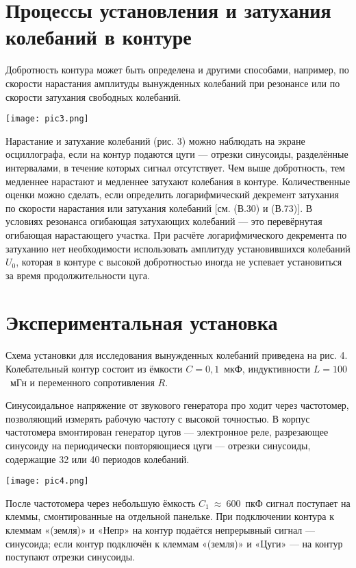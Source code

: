 \section{\label{sec:level1}Процессы
установления
и затухания
колебаний
в
контуре}

Добротность
контура может быть определена
и другими способами,
например, по скорости нарастания амплитуды вынужденных
колебаний при резонансе или по скорости затухания свободных
колебаний.

\texttt{[image: pic3.png]}

Нарастание
и затухание
колебаний
(рис. 3) можно наблюдать на экране осциллографа, если на
контур подаются
цуги — отрезки синусоиды, разделённые интервалами, в течение
которых
сигнал отсутствует. Чем выше добротность, тем медленнее нарастают
и медленнее затухают
колебания в контуре.
Количественные оценки можно сделать,
если определить логарифмический декремент затухания по скорости нарастания или затухания
колебаний [см. (В.30) и (В.73)].
В
условиях резонанса
огибающая затухающих
колебаний
— это перевёрнутая огибающая нарастающего участка. При расчёте логарифмического декремента по затуханию нет необходимости использовать амплитуду
установившихся
колебаний
$U_0$, которая в контуре с высокой добротностью иногда не успевает
установиться за время продолжительности цуга.

\section{\label{sec:level1}Экспериментальная установка}

Схема
установки для исследования
вынужденных
колебаний приведена на рис. 4. Колебательный
контур состоит из ёмкости $C = 0,1$~мкФ, индуктивности $L = 100$~мГн
и переменного
сопротивления
$R$.

Синусоидальное напряжение от звукового генератора про
ходит через
частотомер, позволяющий измерять рабочую частоту с высокой точностью.
В
корпус частотомера вмонтирован генератор цугов
— электронное
реле, разрезающее синусоиду на периодически повторяющиеся цуги
— отрезки синусоиды, содержащие 32 или 40 периодов
колебаний.

\texttt{[image: pic4.png]}

После частотомера через небольшую ёмкость $C_1~\approx~600$~пкФ сигнал
поступает на клеммы, смонтированные на отдельной панельке. При подключении контура к клеммам «(земля)» и «Непр» на контур подаётся
непрерывный сигнал — синусоида; если контур подключён к клеммам
«(земля)» и «Цуги» — на контур поступают отрезки синусоиды.

